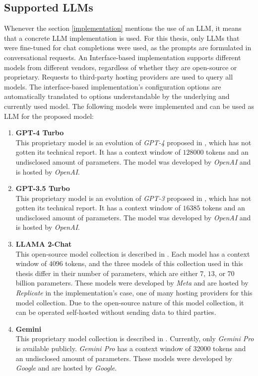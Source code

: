 \documentclass[draft,final]{thesisclass} %
\begin{document}
\subsection{Supported \acs{LLM}s}
Whenever the section \ref{implementation} mentions the use of an \acs{LLM}, it means that a concrete \acs{LLM} implementation is used.
For this thesis, only \acs{LLM}s that were fine-tuned for chat completions were used, as the prompts are formulated in conversational requests.
An Interface-based implementation supports different models from different vendors, regardless of whether they are open-source or proprietary.
Requests to third-party hosting providers are used to query all models. The interface-based implementation's configuration options are automatically translated to options understandable by the underlying and currently used model.
The following models were implemented and can be used as \acs{LLM} for the proposed model:
\begin{enumerate}
    \item \textbf{GPT-4 Turbo}\\
    This proprietary model is an evolution of \textit{GPT-4} proposed in \textcite{gpt4}, which has not gotten its technical report. It has a context window of $128000$ tokens and an undisclosed amount of parameters.
    The model was developed by \textit{OpenAI} and is hosted by \textit{OpenAI}.
    \item \textbf{GPT-3.5 Turbo}\\
    This proprietary model is an evolution of \textit{GPT-3} proposed in \textcite{gpt3}, which has not gotten its technical report. It has a context window of $16385$ tokens and an undisclosed amount of parameters.
    The model was developed by \textit{OpenAI} and is hosted by \textit{OpenAI}.
    \item \textbf{LLAMA 2-Chat}\\
    This open-source model collection is described in \textcite{llama2}. Each model has a context window of $4096$ tokens, and the three models of this collection used in this thesis differ in their number of parameters, which are either $7$, $13$, or $70$ billion parameters.
    These models were developed by \textit{Meta} and are hosted by \textit{Replicate} in the implementation's case, one of many hosting providers for this model collection.
    Due to the open-source nature of this model collection, it can be operated self-hosted without sending data to third parties.
    \item \textbf{Gemini}\\
    This proprietary model collection is described in \textcite{gemini}. Currently, only \textit{Gemini Pro} is available publicly. \textit{Gemini Pro} has a context window of $32000$ tokens and an undisclosed amount of parameters.
    These models were developed by \textit{Google} and are hosted by \textit{Google}.
\end{enumerate}
\end{document}
